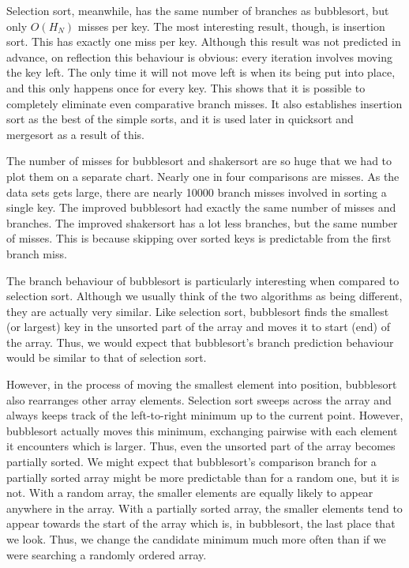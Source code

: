 Selection sort, meanwhile, has the same number of branches as bubblesort, but
only $O(H_N)$ misses per key. The most interesting result, though, is insertion
sort. This has exactly one miss per key. Although this result was not predicted
in advance, on reflection this behaviour is obvious: every iteration involves
moving the key left. The only time it will not move left is when its being put
into place, and this only happens once for every key. This shows that it is
possible to completely eliminate even comparative branch misses. It also
establishes insertion sort as the best of the simple sorts, and it is used later
in quicksort and mergesort as a result of this. \label{insertion is predictable}

The number of misses for bubblesort and shakersort are so huge that we had to
plot them on a separate chart. Nearly one in four comparisons are misses. As the
data sets gets large, there are nearly 10000 branch misses involved in sorting
a single key. The improved bubblesort had exactly the same number of misses and
branches. The improved shakersort has a lot less branches, but the same number
of misses. This is because skipping over sorted keys is predictable from the
first branch miss.

The branch behaviour of bubblesort is particularly interesting when compared to
selection sort. Although we usually think of the two algorithms as being
different, they are actually very similar. Like selection sort, bubblesort finds
the smallest (or largest) key in the unsorted part of the array and moves it to
start (end) of the array. Thus, we would expect that bubblesort's branch
prediction behaviour would be similar to that of selection sort.

However, in the process of moving the smallest element into position, bubblesort
also rearranges other array elements. Selection sort sweeps across the array and
always keeps track of the left-to-right minimum up to the current point.
However, bubblesort actually moves this minimum, exchanging pairwise with each
element it encounters which is larger. Thus, even the unsorted part of the array
becomes partially sorted. We might expect that bubblesort's comparison branch
for a partially sorted array might be more predictable than for a random one,
but it is not. With a random array, the smaller elements are equally likely to
appear anywhere in the array. With a partially sorted array, the smaller
elements tend to appear towards the start of the array which is, in bubblesort,
the last place that we look. Thus, we change the candidate minimum much more
often than if we were searching a randomly ordered array.


